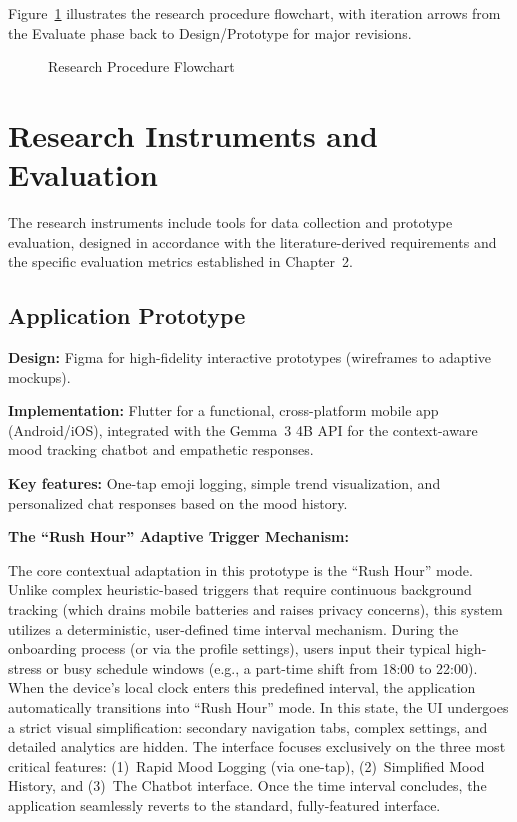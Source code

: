 Figure~\ref{fig:flowchart} illustrates the research procedure flowchart, with iteration arrows from the Evaluate phase back to Design/Prototype for major revisions.

\begin{figure}[h]
    \centering
    \caption{Research Procedure Flowchart}
    \label{fig:flowchart}
\end{figure}

\section{Research Instruments and Evaluation}

The research instruments include tools for data collection and prototype evaluation, designed in accordance with the literature-derived requirements and the specific evaluation metrics established in Chapter~2.

\subsection{Application Prototype}

\textbf{Design:} Figma for high-fidelity interactive prototypes (wireframes to adaptive mockups).

\textbf{Implementation:} Flutter for a functional, cross-platform mobile app (Android/iOS), integrated with the Gemma~3 4B API for the context-aware mood tracking chatbot and empathetic responses.

\textbf{Key features:} One-tap emoji logging, simple trend visualization, and personalized chat responses based on the mood history.

\textbf{The ``Rush Hour'' Adaptive Trigger Mechanism:}

The core contextual adaptation in this prototype is the ``Rush Hour'' mode. Unlike complex heuristic-based triggers that require continuous background tracking (which drains mobile batteries and raises privacy concerns), this system utilizes a deterministic, user-defined time interval mechanism. During the onboarding process (or via the profile settings), users input their typical high-stress or busy schedule windows (e.g., a part-time shift from 18:00 to 22:00). When the device's local clock enters this predefined interval, the application automatically transitions into ``Rush Hour'' mode. In this state, the UI undergoes a strict visual simplification: secondary navigation tabs, complex settings, and detailed analytics are hidden. The interface focuses exclusively on the three most critical features: (1)~Rapid Mood Logging (via one-tap), (2)~Simplified Mood History, and (3)~The Chatbot interface. Once the time interval concludes, the application seamlessly reverts to the standard, fully-featured interface.

